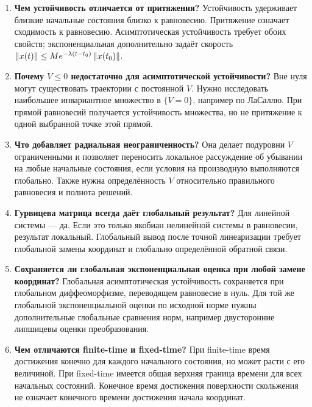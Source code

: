 \begin{enumerate}
\item \textbf{Чем устойчивость отличается от притяжения?}
Устойчивость удерживает близкие начальные состояния близко к равновесию.
Притяжение означает сходимость к равновесию. Асимптотическая устойчивость
требует обоих свойств; экспоненциальная дополнительно задаёт скорость
$\left\lVert x(t)\right\rVert\le M e^{-\lambda(t-t_0)}\left\lVert x(t_0)\right\rVert$.

\item \textbf{Почему $\dot V\le0$ недостаточно для асимптотической устойчивости?}
Вне нуля могут существовать траектории с постоянной $V$. Нужно исследовать
наибольшее инвариантное множество в $\{\dot V=0\}$, например по ЛаСаллю.
При прямой равновесий получается устойчивость множества, но не притяжение
к одной выбранной точке этой прямой.

\item \textbf{Что добавляет радиальная неограниченность?}
Она делает подуровни $V$ ограниченными и позволяет переносить локальное
рассуждение об убывании на любые начальные состояния, если условия на
производную выполняются глобально. Также нужна определённость $V$
относительно правильного равновесия и полнота решений.

\item \textbf{Гурвицева матрица всегда даёт глобальный результат?}
Для линейной системы --- да. Если это только якобиан нелинейной системы
в равновесии, результат локальный. Глобальный вывод после точной
линеаризации требует глобальной замены координат и глобально определённой
обратной связи.

\item \textbf{Сохраняется ли глобальная экспоненциальная оценка при любой замене координат?}
Глобальная асимптотическая устойчивость сохраняется при глобальном
диффеоморфизме, переводящем равновесие в нуль. Для той же глобальной
экспоненциальной оценки по исходной норме нужны дополнительные глобальные
сравнения норм, например двусторонние липшицевы оценки преобразования.

\item \textbf{Чем отличаются finite-time и fixed-time?}
При finite-time время достижения конечно для каждого начального состояния,
но может расти с его величиной. При fixed-time имеется общая верхняя граница
времени для всех начальных состояний. Конечное время достижения поверхности
скольжения не означает конечного времени достижения начала координат.
\end{enumerate}

